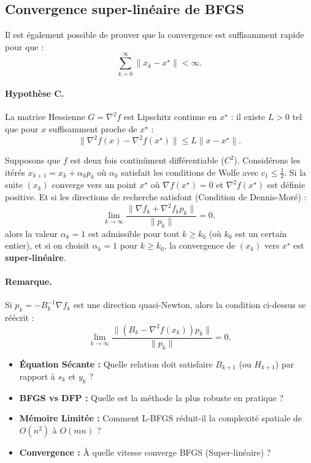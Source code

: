 \subsection{Convergence super-linéaire de BFGS}

Il est également possible de prouver que la convergence est suffisamment rapide pour que :
\[
    \sum_{k=0}^\infty \|x_k - x^\star\| < \infty.
\]

\paragraph{Hypothèse C.}
La matrice Hessienne $G = \nabla^2 f$ est Lipschitz continue en $x^\star$ : il existe $L > 0$ tel que pour $x$ suffisamment proche de $x^\star$ :
\[
    \| \nabla^2 f(x) - \nabla^2 f(x^\star) \| \le L \| x - x^\star \|.
\]

\begin{theoreme}[Admis]
    Supposons que $f$ est deux fois continûment différentiable ($C^2$).
    Considérons les itérés $x_{k+1} = x_k + \alpha_k p_k$ où $\alpha_k$ satisfait les conditions de Wolfe avec $c_1 \le \frac{1}{2}$.
    Si la suite $(x_k)$ converge vers un point $x^\star$ où $\nabla f(x^\star) = 0$ et $\nabla^2 f(x^\star)$ est définie positive.
    Et si les directions de recherche satisfont (Condition de Dennis-Moré) :
    \begin{equation}
        \lim_{k \to \infty} \frac{\| \nabla f_k + \nabla^2 f_k p_k \|}{\| p_k \|} = 0,
    \end{equation}
    alors la valeur $\alpha_k = 1$ est admissible pour tout $k \ge k_0$ (où $k_0$ est un certain entier),
    et si on choisit $\alpha_k = 1$ pour $k \ge k_0$, la convergence de $(x_k)$ vers $x^\star$ est \textbf{super-linéaire}.
\end{theoreme}

\paragraph{Remarque.}
Si $p_k = -B_k^{-1} \nabla f_k$ est une direction quasi-Newton, alors la condition ci-dessus se réécrit :
\[
    \lim_{k \to \infty} \frac{\| (B_k - \nabla^2 f(x_k)) p_k \|}{\| p_k \|} = 0.
\]
\bigskip
\begin{checkpoint}
\begin{itemize}
    \item \textbf{Équation Sécante :} Quelle relation doit satisfaire $B_{k+1}$ (ou $H_{k+1}$) par rapport à $s_k$ et $y_k$ ?
    \item \textbf{BFGS vs DFP :} Quelle est la méthode la plus robuste en pratique ?
    \item \textbf{Mémoire Limitée :} Comment L-BFGS réduit-il la complexité spatiale de $O(n^2)$ à $O(mn)$ ?
    \item \textbf{Convergence :} À quelle vitesse converge BFGS (Super-linéaire) ?
\end{itemize}
\end{checkpoint}

